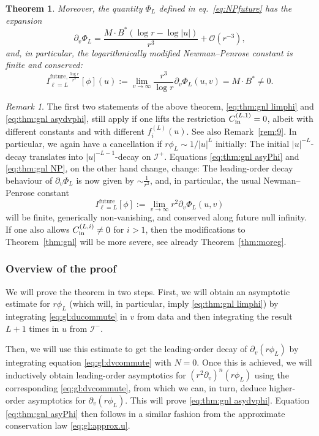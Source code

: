 \documentclass[11pt,english]{article}
\numberwithin{equation}{section}
\newtheorem{thm}{Theorem}[section]
\theoremstyle{remark}
\newtheorem{rem}{Remark}[section]
\theoremstyle{plain}
\theoremstyle{remark}
\newcommand{\pv}{\partial_v}
\renewcommand{\(}{\left(}
\renewcommand{\)}{\right)}
\begin{document}
\begin{thm}
Moreover, the quantity $\Phi_L$ defined in eq.\ \eqref{eq:NPfuture} has the expansion
\begin{equation}\label{eq:thm:gnl asyPhi}
\pv\Phi_L=\frac{ M\cdot B^*(\log r-\log|u|)}{r^{3}}+\mathcal{O}(r^{-3}),
\end{equation}
and, in particular, the logarithmically modified Newman--Penrose constant is finite and conserved:
\begin{equation}\label{eq:thm:gnl NP}
I_{\ell=L}^{\mathrm{future},\frac{\log r}{r^3}}[\phi](u):=\lim_{v\to\infty}\frac{r^3}{\log r}\pv\Phi_L(u,v)=M\cdot B^*\neq 0.
\end{equation}

\end{thm}
\begin{rem}\label{rem:thm:gnl}
The first two statements of the above theorem, \eqref{eq:thm:gnl limphi} and \eqref{eq:thm:gnl asydvphi}, still apply if one lifts the restriction $C_{\mathrm{in}}^{(L,1)}=0$, albeit with different constants and with different $f_i^{(L)}(u)$. See also Remark~\ref{rem:9}. In particular,  we again have a cancellation if $r\phi_L\sim 1/|u|^L$ initially: The initial $|u|^{-L}$-decay translates into $|u|^{-L-1}$-decay on $\mathcal I^+$.
Equations \eqref{eq:thm:gnl asyPhi} and \eqref{eq:thm:gnl NP}, on the other hand change, change: The leading-order decay behaviour of $\pv\Phi_L$ is now given by $\sim\frac{1}{r^2}$, and, in particular, the usual Newman--Penrose constant
\begin{equation}
I_{\ell=L}^{\mathrm{future}}[\phi]:=\lim_{v\to\infty}r^2\pv\Phi_L(u,v)
\end{equation}
will be finite, generically non-vanishing, and conserved along future null infinity. If one also allows $C_{\mathrm{in}}^{(L,i)}\neq 0$ for $i>1$, then the modifications to Theorem~\ref{thm:gnl} will be more severe, see already Theorem~\ref{thm:moreg}.
\end{rem}
\subsubsection*{Overview of the proof}
We will prove the theorem in two steps. First, we will obtain an asymptotic estimate for $r\phi_L$ (which will, in particular, imply \eqref{eq:thm:gnl limphi}) by integrating \eqref{eq:gl:ducommute} in $v$ from data and then integrating the result $L+1$ times in $u$ from $\mathcal I^-$. 

Then, we will use this estimate to get  the leading-order decay of $\pv(r\phi_L)$ by integrating equation \eqref{eq:gl:dvcommute} with $N=0$. 
Once this is achieved, we will inductively obtain leading-order asymptotics for $(r^2\pv)^n(r\phi_L)$ using the corresponding \eqref{eq:gl:dvcommute}, from which we can,  in turn, deduce higher-order asymptotics for $\pv(r\phi_L)$. 
This will prove \eqref{eq:thm:gnl asydvphi}. 
Equation \eqref{eq:thm:gnl asyPhi} then follows in a similar fashion from the approximate conservation law \eqref{eq:gl:approx.u}.
\end{document}
